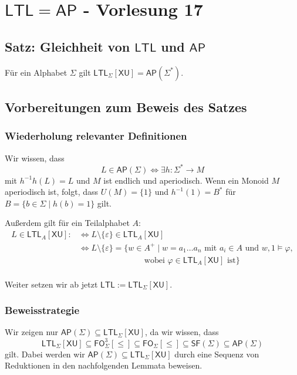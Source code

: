 \documentclass[12pt, german]{article}
\newcommand{\sigstern}{\Sigma^\ast}
\newcommand{\inv}{^{-1}}
\newcommand{\starfree}{\mathsf{SF}}
\newcommand{\bast}{B^{\ast}}
\newcommand{\sast}{\Sigma^{\ast}}
\newcommand{\fo}{\mathsf{FO}}
\newcommand{\ap}{\mathsf{AP}}
\newcommand{\ltl}{\mathsf{LTL}}
\newcommand{\sX}{\mathsf{X}}
\newcommand{\sU}{\mathsf{U}}
\begin{document}
\section{$\ltl = \ap$ - Vorlesung 17}
\label{sec:vl17}

\subsection{Satz: Gleichheit von $\ltl$ und $\ap$}
\label{sec:ltl_is_ap}
Für ein Alphabet $\Sigma$ gilt $\ltl_\Sigma[\sX \sU] = \ap(\sast)$.



\subsection{Vorbereitungen zum Beweis des Satzes}
\subsubsection{Wiederholung relevanter Definitionen}
	Wir wissen, dass $$L \in \ap(\Sigma) \iff \exists h : \sigstern \to M$$ mit $h\inv h (L) = L$ und $M$ ist endlich und aperiodisch. 
	Wenn ein Monoid $M$ aperiodisch ist, folgt, dass $U(M) = \{1\}$ und $h\inv(1) = \bast$ für $B=\{b \in \Sigma \mid  h(b) = 1\}$ gilt. \newline
	
	Au\ss erdem gilt für ein Teilalphabet $A$:
	\begin{align*}
	L \in \ltl_A[\sX\sU] :&\iff L \setminus \{\varepsilon\} \in \ltl_A[\sX\sU] \\
		&\iff  L \setminus \{\varepsilon\} = \{w \in A^+ \mid  w = a_1\ldots a_n \text{ mit } a_i \in A \text{ und } w,1 \models \varphi, \\
		&\hspace{92pt}\text{ wobei } \varphi \in  \ltl_A[\sX\sU] \text{ ist}\}\\
	\end{align*} 

	Weiter setzen wir ab jetzt $\ltl :=  \ltl_\Sigma[\sX\sU]$.


\subsubsection{Beweisstrategie}
 Wir zeigen nur $\ap(\Sigma) \subseteq \ltl_\Sigma[\sX\sU]$, da wir wissen, dass $$\ltl_\Sigma[\sX\sU] \subseteq \fo_\Sigma^3[\leq] \subseteq \fo_\Sigma[\leq] \subseteq \starfree(\Sigma) \subseteq \ap(\Sigma) $$
 gilt.
 Dabei werden wir $\ap(\Sigma) \subseteq \ltl_\Sigma[\sX\sU]$ durch eine Sequenz von Reduktionen in den nachfolgenden Lemmata beweisen.\newline
 
\end{document}
